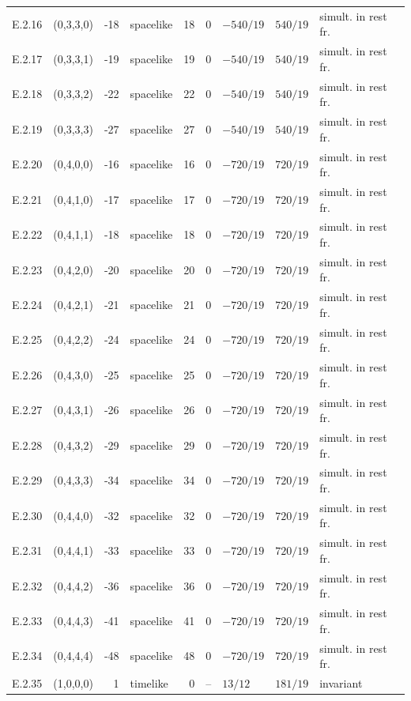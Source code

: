 {\begin{longtable}{@{}llrlrllll@{}}
E.2.16 & (0,3,3,0) & -18 & spacelike & 18 & $0$ & $-540/19$ & $540/19$ & simult. in rest fr. \\
E.2.17 & (0,3,3,1) & -19 & spacelike & 19 & $0$ & $-540/19$ & $540/19$ & simult. in rest fr. \\
E.2.18 & (0,3,3,2) & -22 & spacelike & 22 & $0$ & $-540/19$ & $540/19$ & simult. in rest fr. \\
E.2.19 & (0,3,3,3) & -27 & spacelike & 27 & $0$ & $-540/19$ & $540/19$ & simult. in rest fr. \\
E.2.20 & (0,4,0,0) & -16 & spacelike & 16 & $0$ & $-720/19$ & $720/19$ & simult. in rest fr. \\
E.2.21 & (0,4,1,0) & -17 & spacelike & 17 & $0$ & $-720/19$ & $720/19$ & simult. in rest fr. \\
E.2.22 & (0,4,1,1) & -18 & spacelike & 18 & $0$ & $-720/19$ & $720/19$ & simult. in rest fr. \\
E.2.23 & (0,4,2,0) & -20 & spacelike & 20 & $0$ & $-720/19$ & $720/19$ & simult. in rest fr. \\
E.2.24 & (0,4,2,1) & -21 & spacelike & 21 & $0$ & $-720/19$ & $720/19$ & simult. in rest fr. \\
E.2.25 & (0,4,2,2) & -24 & spacelike & 24 & $0$ & $-720/19$ & $720/19$ & simult. in rest fr. \\
E.2.26 & (0,4,3,0) & -25 & spacelike & 25 & $0$ & $-720/19$ & $720/19$ & simult. in rest fr. \\
E.2.27 & (0,4,3,1) & -26 & spacelike & 26 & $0$ & $-720/19$ & $720/19$ & simult. in rest fr. \\
E.2.28 & (0,4,3,2) & -29 & spacelike & 29 & $0$ & $-720/19$ & $720/19$ & simult. in rest fr. \\
E.2.29 & (0,4,3,3) & -34 & spacelike & 34 & $0$ & $-720/19$ & $720/19$ & simult. in rest fr. \\
E.2.30 & (0,4,4,0) & -32 & spacelike & 32 & $0$ & $-720/19$ & $720/19$ & simult. in rest fr. \\
E.2.31 & (0,4,4,1) & -33 & spacelike & 33 & $0$ & $-720/19$ & $720/19$ & simult. in rest fr. \\
E.2.32 & (0,4,4,2) & -36 & spacelike & 36 & $0$ & $-720/19$ & $720/19$ & simult. in rest fr. \\
E.2.33 & (0,4,4,3) & -41 & spacelike & 41 & $0$ & $-720/19$ & $720/19$ & simult. in rest fr. \\
E.2.34 & (0,4,4,4) & -48 & spacelike & 48 & $0$ & $-720/19$ & $720/19$ & simult. in rest fr. \\
E.2.35 & (1,0,0,0) & 1 & timelike & 0 & -- & $13/12$ & $181/19$ & invariant \\

\end{longtable}}
